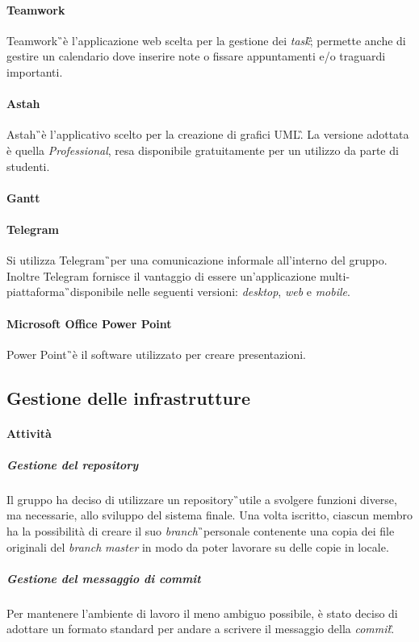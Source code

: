 \paragraph{Teamwork} Teamwork\G\ è l'applicazione web scelta per la gestione dei \textit{task}\G; permette anche di gestire un calendario dove inserire note o fissare appuntamenti e/o traguardi importanti.
\paragraph{Astah} Astah\G\ è l’applicativo scelto per la creazione di grafici UML\G. La versione adottata è quella \textit{Professional}, resa disponibile gratuitamente per un utilizzo da parte di studenti.
\paragraph{Gantt} 
\paragraph{Telegram} Si utilizza Telegram\G\ per una comunicazione informale all'interno del 
gruppo. Inoltre Telegram fornisce il vantaggio di essere un'applicazione 
multi-piattaforma\G\ disponibile nelle seguenti versioni: \textit{desktop}, \textit{web} e \textit{mobile}.
\paragraph{Microsoft Office Power Point} Power Point\G\ è il software utilizzato per creare presentazioni.

\subsection{Gestione delle infrastrutture}

\paragraph{Attività} 
\subparagraph{Gestione del repository} Il gruppo ha deciso di utilizzare un repository\G\ utile a svolgere funzioni diverse, ma necessarie, allo sviluppo del sistema finale. Una volta iscritto, ciascun membro ha la possibilità di creare il suo \textit{branch}\G\ personale contenente una copia dei file originali del \textit{branch} \textit{master} in modo da poter lavorare su delle copie in locale.

\subparagraph{Gestione del messaggio di commit} Per mantenere l'ambiente di lavoro il meno ambiguo possibile, è stato deciso di adottare un formato standard per andare a scrivere il messaggio della \textit{commit}\G.

